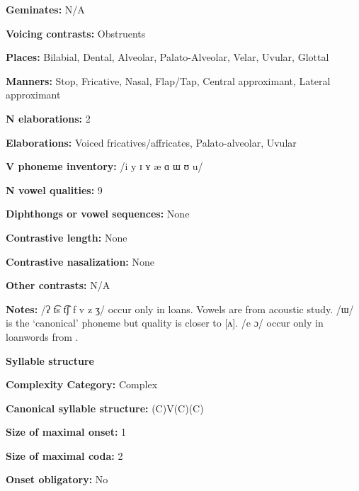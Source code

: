 \textbf{Geminates:} N/A



\textbf{Voicing contrasts:} Obstruents



\textbf{Places:} Bilabial, Dental, Alveolar, Palato-Alveolar, Velar, Uvular, Glottal



\textbf{Manners:} Stop, Fricative, Nasal, Flap/Tap, Central approximant, Lateral approximant



\textbf{N elaborations:} 2



\textbf{Elaborations:} Voiced fricatives/affricates, Palato-alveolar, Uvular



\textbf{V phoneme inventory:} /i y ɪ ʏ æ ɑ ɯ ʊ u/



\textbf{N vowel qualities:} 9



\textbf{Diphthongs or vowel sequences:} None



\textbf{Contrastive length:} None



\textbf{Contrastive nasalization:} None



\textbf{Other contrasts:} N/A



\textbf{Notes:} /ʔ t͡s t͡ʃ f v z ʒ/ occur only in loans. Vowels are from \citet{CarterRobbins2016} acoustic study. /ɯ/ is the ‘canonical’ phoneme but quality is closer to [ʌ]. /e ɔ/ occur only in loanwords from .



\textbf{Syllable structure}



\textbf{Complexity Category:} Complex



\textbf{Canonical syllable structure:} (C)V(C)(C) \citep[12-18]{Poppe1964}



\textbf{Size of maximal onset:} 1



\textbf{Size of maximal coda:} 2



\textbf{Onset obligatory:} No



